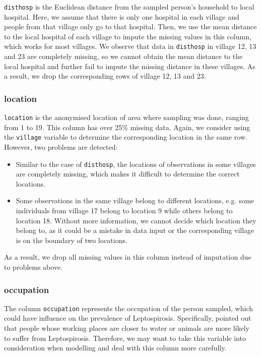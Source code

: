 \documentclass[11pt,twoside]{article}
\numberwithin{Theorem}{section}
\numberwithin{Definition}{section}
\numberwithin{Lemma}{section}
\numberwithin{Algorithm}{section}
\numberwithin{equation}{section}
\begin{document}
\texttt{disthosp} is the Euclidean distance from the sampled person's household to local hospital. Here, we assume that there is only one hospital in each village and people from that village only go to that hospital. Then, we use the mean distance to the local hospital of each village to impute the missing values in this column, which works for most villages. We observe that data in \texttt{disthosp} in village 12, 13 and 23 are completely missing, so we cannot obtain the mean distance to the local hospital and further fail to impute the missing distance in these villages. As a result, we drop the corresponding rows of village 12, 13 and 23.

\subsubsection{location}

\texttt{location} is the anonymised location of area where sampling was done, ranging from 1 to 19. This column has over 25\% missing data. Again, we consider using the \texttt{village} variable to determine the corresponding location in the same row. However, two problems are detected:

\begin{itemize}
	\item Similar to the case of \texttt{disthosp}, the locations of observations in some villages are completely missing, which makes it difficult to determine the correct locations.
	\item Some observations in the same village belong to different locations, e.g. some individuals from village 17 belong to location 9 while others belong to location 18. Without more information, we cannot decide which location they belong to, as it could be a mistake in data input or the corresponding village is on the boundary of two locations.
\end{itemize}

As a result, we drop all missing values in this column instead of imputation due to problems above.

\subsubsection{occupation}

The column \texttt{occupation} represents the occupation of the person sampled, which could have influence on the prevalence of Leptospirosis. Specifically, \cite{cook2017risk} pointed out that people whose working places are closer to water or animals are more likely to suffer from Leptospirosis. Therefore, we may want to take this variable into consideration when modelling and deal with this column more carefully. 
\end{document}
